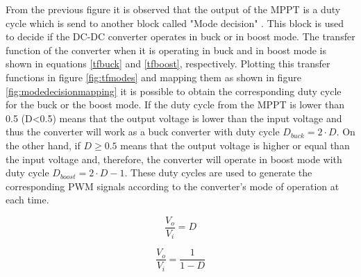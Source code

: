 From the previous figure it is observed that the output of the MPPT is a duty cycle which is send to another block called "Mode decision" . This block is used to decide if the DC-DC converter operates in buck or in boost mode. The transfer function of the converter when it is operating in buck and in boost mode is shown in equations \ref{tfbuck} and \ref{tfboost}, respectively. Plotting this transfer functions in figure \ref{fig:tfmodes} and mapping them as shown in figure \ref{fig:modedecisionmapping} it is possible to obtain the corresponding duty cycle for the buck or the boost mode. If the duty cycle from the MPPT  is lower than 0.5 (D<0.5) means that the output voltage is lower than the input voltage and thus the converter will work as a buck converter with duty cycle $D_{buck}=2\cdot D$. On the other hand, if $D \geq 0.5$ means that the output voltage is higher or equal than the input voltage and, therefore, the converter will operate in boost mode with duty cycle $D_{boost}=2\cdot D - 1$. These duty cycles are used to generate the corresponding PWM signals according to the converter's mode of operation at each time. 

\vspace{1cm}
\begin{minipage}{0.3\linewidth}
	\begin{equation}
	\frac{V_o}{V_i} = D
	\end{equation}
	\label{tfbuck}
\end{minipage}%
\begin{minipage}{0.5\linewidth}
	\begin{equation}
	\frac{V_o}{V_i}= \frac{1}{1-D}
	\end{equation}
	\label{tfboost}
\end{minipage}

